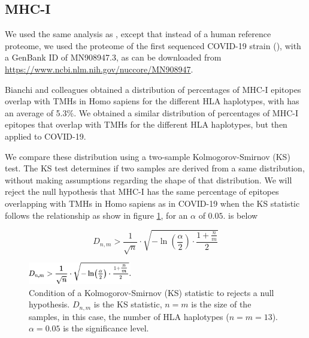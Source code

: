 \documentclass{article}
\begin{document}
\subsection{MHC-I}

We used the same analysis as \cite{bianchi2017},
except that instead of a human reference proteome,
we used the proteome of the first sequenced COVID-19 strain (\cite{wu2020new}),
with a GenBank ID of MN908947.3, as can be downloaded 
from \url{https://www.ncbi.nlm.nih.gov/nuccore/MN908947}.

Bianchi and colleagues obtained a distribution of 
percentages of MHC-I epitopes overlap with TMHs in Homo sapiens
for the different HLA haplotypes, with has an average of 5.3\%.
We obtained a similar distribution of percentages of MHC-I epitopes that 
overlap with TMHs for the different HLA haplotypes, but then applied to
COVID-19.

We compare these distribution using a two-sample 
Kolmogorov-Smirnov (KS) test. The KS test determines if two samples
are derived from a same distribution, without making assumptions
regarding the shape of that distribution. We will reject
the null hypothesis that MHC-I has the same percentage of epitopes 
overlapping with TMHs in Homo sapiens as in COVID-19 when 
the KS statistic follows the relationship as show in 
figure \ref{fig:ks}, for an $\alpha$ of $0.05$.
is below 

\begin{equation}
   D_{n,m} > \frac{1}{\sqrt{n}} \cdot \sqrt{ -\ln(\frac{\alpha}{2}) \cdot \frac{1 + \frac{n}{m}}{2} }
\end{equation}

\begin{figure}[!htbp]
  \includegraphics[width=0.4\textwidth]{pics/ks.png}
  \caption{
    Condition of a Kolmogorov-Smirnov (KS) statistic to rejects a null
    hypothesis. $D_{n,m}$ is the KS statistic, $n = m$ is the size
    of the samples, in this case, the number of HLA haplotypes ($n = m = 13$).
    $\alpha = 0.05$ is the significance level.
  }
  \label{fig:ks}
\end{figure}

\end{document}
